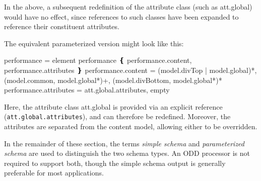 In the above, a subsequent redefinition of the attribute class (such as \textsf{att.global}) would have no effect, since references to such classes have been expanded to reference their constituent attributes.\par
The equivalent parameterized version might look like this: \par\hfill\bgroup\exampleFont\vskip 10pt\begin{shaded}
\obeyspaces performance =\newline
  element performance ❴ performance.content, performance.attributes ❵\newline
performance.content =\newline
  (model.divTop | model.global)*,\newline
  (model.common, model.global*)+,\newline
  (model.divBottom, model.global*)*\newline
performance.attributes = att.global.attributes, empty\end{shaded}
\par\egroup 
 Here, the attribute class \textsf{att.global} is provided via an explicit reference (\texttt{att.global.attributes}), and can therefore be redefined. Moreover, the attributes are separated from the content model, allowing either to be overridden.\par
In the remainder of these section, the terms \textit{simple schema} and \textit{parameterized schema} are used to distinguish the two schema types. An ODD processor is not required to support both, though the simple schema output is generally preferable for most applications.\par
